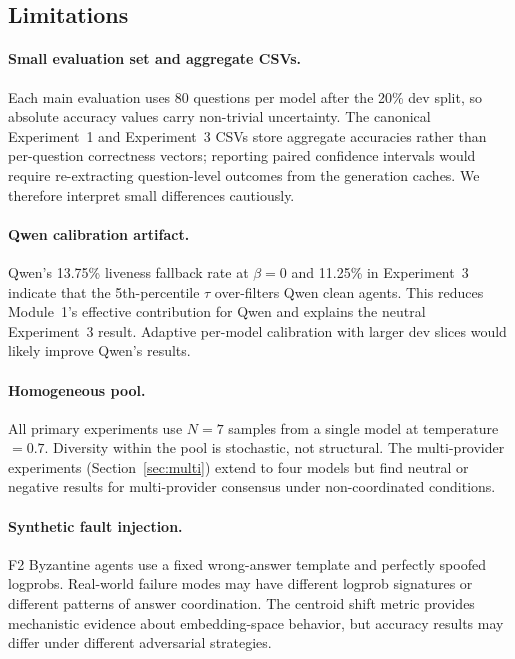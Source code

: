 \documentclass[11pt]{article}
\begin{document}
\subsection{Limitations}
\label{sec:limitations}

\paragraph{Small evaluation set and aggregate CSVs.}
Each main evaluation uses 80 questions per model after the 20\% dev split, so
absolute accuracy values carry non-trivial uncertainty. The canonical Experiment~1
and Experiment~3 CSVs store aggregate accuracies rather than per-question
correctness vectors; reporting paired confidence intervals would require
re-extracting question-level outcomes from the generation caches. We therefore
interpret small differences cautiously.

\paragraph{Qwen calibration artifact.}
Qwen's 13.75\% liveness fallback rate at $\beta=0$ and 11.25\% in Experiment~3
indicate that the 5th-percentile $\tau$ over-filters Qwen clean agents. This
reduces Module~1's effective contribution for Qwen and explains the neutral
Experiment~3 result. Adaptive per-model calibration with larger dev slices would
likely improve Qwen's results.

\paragraph{Homogeneous pool.}
All primary experiments use $N=7$ samples from a single model at
temperature$=0.7$. Diversity within the pool is stochastic, not structural. The
multi-provider experiments (Section~\ref{sec:multi}) extend to four models but
find neutral or negative results for multi-provider consensus under
non-coordinated conditions.

\paragraph{Synthetic fault injection.}
F2 Byzantine agents use a fixed wrong-answer template and perfectly spoofed
logprobs. Real-world failure modes may have different logprob signatures or
different patterns of answer coordination. The centroid shift metric provides
mechanistic evidence about embedding-space behavior, but accuracy results may
differ under different adversarial strategies.
\end{document}
